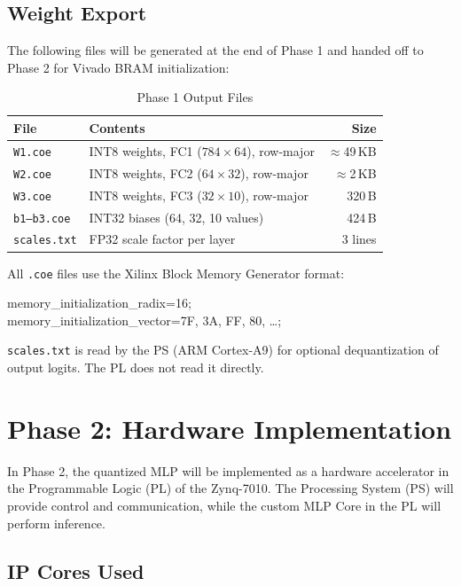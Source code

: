 \documentclass[12pt, letterpaper]{article}
\begin{document}
\subsection{Weight Export}

The following files will be generated at the end of Phase 1 and handed off to
Phase 2 for Vivado BRAM initialization:

\begin{table}[H]
\centering
\caption{Phase 1 Output Files}
\begin{tabular}{llr}
\toprule
\textbf{File} & \textbf{Contents} & \textbf{Size} \\
\midrule
\texttt{W1.coe} & INT8 weights, FC1 ($784\times64$), row-major & $\approx$49\,KB \\
\texttt{W2.coe} & INT8 weights, FC2 ($64\times32$), row-major  & $\approx$2\,KB  \\
\texttt{W3.coe} & INT8 weights, FC3 ($32\times10$), row-major  & 320\,B          \\
\texttt{b1--b3.coe} & INT32 biases (64, 32, 10 values)         & 424\,B          \\
\texttt{scales.txt} & FP32 scale factor per layer              & 3 lines         \\
\bottomrule
\end{tabular}
\end{table}

All \texttt{.coe} files use the Xilinx Block Memory Generator format:
\begin{center}\small\ttfamily
memory\_initialization\_radix=16;\\
memory\_initialization\_vector=7F, 3A, FF, 80, \ldots ;
\end{center}

\texttt{scales.txt} is read by the PS (ARM Cortex-A9) for optional
dequantization of output logits. The PL does not read it directly.


\section{Phase 2: Hardware Implementation}

In Phase 2, the quantized MLP will be implemented as a hardware accelerator in the Programmable Logic (PL) of the Zynq-7010. The Processing System (PS) will provide control and communication, while the custom MLP Core in the PL will perform inference.

\subsection{IP Cores Used}
\end{document}
